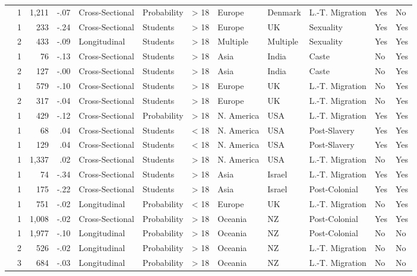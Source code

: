 \documentclass[10pt, letterpaper]{article}
\begin{document}
\begin{landscape}
\begin{xltabular}{650pt}{Xrrrllrlllll}
\cite{3051} & 1 & 1,211 & -.07 & Cross-Sectional & Probability & > 18 & Europe & Denmark & L.-T. Migration & Yes & No\\
\cite{956} & 1 & 233 & -.24 & Cross-Sectional & Students & > 18 & Europe & UK & Sexuality & Yes & Yes\\
 & 2 & 433 & -.09 & Longitudinal & Students & > 18 & Multiple & Multiple & Sexuality & Yes & Yes\\
\cite{2380} & 1 & 76 & -.13 & Cross-Sectional & Students & > 18 & Asia & India & Caste & No & Yes\\
 & 2 & 127 & -.00 & Cross-Sectional & Students & > 18 & Asia & India & Caste & No & Yes\\
\cite{2399} & 1 & 579 & -.10 & Cross-Sectional & Students & > 18 & Europe & UK & L.-T. Migration & No & Yes\\
 & 2 & 317 & -.04 & Cross-Sectional & Students & > 18 & Europe & UK & L.-T. Migration & No & Yes\\
\cite{803} & 1 & 429 & -.12 & Cross-Sectional & Probability & > 18 & N. America & USA & L.-T. Migration & Yes & Yes\\
\cite{703} & 1 & 68 & .04 & Cross-Sectional & Students & < 18 & N. America & USA & Post-Slavery & Yes & Yes\\
\cite{244} & 1 & 129 & .04 & Cross-Sectional & Students & < 18 & N. America & USA & Post-Slavery & Yes & Yes\\
\cite{2333} & 1 & 1,337 & .02 & Cross-Sectional & Students & > 18 & N. America & USA & L.-T. Migration & No & Yes\\
\cite{4005} & 1 & 74 & -.34 & Cross-Sectional & Students & > 18 & Asia & Israel & L.-T. Migration & Yes & Yes\\
\cite{813} & 1 & 175 & -.22 & Cross-Sectional & Students & > 18 & Asia & Israel & Post-Colonial & Yes & Yes\\
\cite{2382} & 1 & 751 & -.02 & Longitudinal & Probability & < 18 & Europe & UK & L.-T. Migration & No & Yes\\
\cite{1695} & 1 & 1,008 & -.02 & Cross-Sectional & Probability & > 18 & Oceania & NZ & Post-Colonial & Yes & Yes\\
\cite{2381} & 1 & 1,977 & -.10 & Longitudinal & Probability & > 18 & Oceania & NZ & Post-Colonial & No & No\\
 & 2 & 526 & -.02 & Longitudinal & Probability & > 18 & Oceania & NZ & L.-T. Migration & No & No\\
 & 3 & 684 & -.03 & Longitudinal & Probability & > 18 & Oceania & NZ & L.-T. Migration & No & No\\

\end{xltabular}
\end{landscape}
\end{document}
